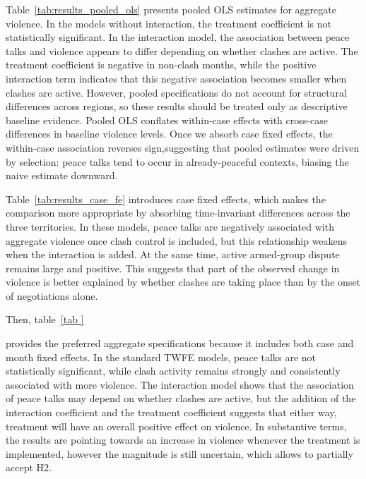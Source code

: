 \documentclass[11pt]{article}
\begin{document}
Table~\ref{tab:results_pooled_ols} presents pooled OLS estimates for aggregate violence. In the models without interaction, the treatment coefficient is not statistically significant. In the interaction model, the association between peace talks and violence appears to differ depending on whether clashes are active. The treatment coefficient is negative in non-clash months, while the positive interaction term indicates that this negative association becomes smaller when clashes are active. However, pooled specifications do not account for structural differences across regions, so these results should be treated only as descriptive baseline evidence. Pooled OLS conflates within-case effects with cross-case differences in baseline violence levels. Once we absorb case fixed effects, the within-case association reverses sign,suggesting that pooled estimates were driven by selection: peace talks tend to occur in already-peaceful contexts, biasing the naive estimate downward. 

{\small\setlength{\tabcolsep}{4pt}}

{\small\setlength{\tabcolsep}{4pt}}

Table~\ref{tab:results_case_fe} introduces case fixed effects, which makes the comparison more appropriate by absorbing time-invariant differences across the three territories. In these models, peace talks are negatively associated with aggregate violence once clash control is included, but this relationship weakens when the interaction is added. At the same time, active armed-group dispute remains large and positive. This suggests that part of the observed change in violence is better explained by whether clashes are taking place than by the onset of negotiations alone.



Then, table~\ref{tab        } 

provides the preferred aggregate specifications because it includes both case and month fixed effects. In the standard TWFE models, peace talks are not statistically significant, while clash activity remains strongly and consistently associated with more violence. The interaction model shows that the association of peace talks may depend on whether clashes are active, but the addition of the interaction coefficient and the treatment coefficient suggests that either way, treatment will have an overall positive effect on violence. In substantive terms, the results are pointing towards an increase in violence whenever the treatment is implemented, however the magnitude is still uncertain, which allows to partially accept H2.
\end{document}
